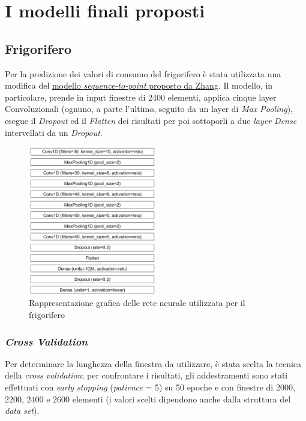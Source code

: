 \documentclass[12pt,a4paper,fleqn]{article}
\begin{document}
\section{I modelli finali proposti}

\subsection{Frigorifero}
Per la predizione dei valori di consumo del frigorifero è stata utilizzata una modifica del \href{https://arxiv.org/abs/1612.09106}{modello \textsl{sequence-to-point} proposto da Zhang}.
Il modello, in particolare, prende in input finestre di 2400 elementi, applica cinque layer Convoluzionali (ognuno, a parte l'ultimo, seguito da un layer di \textsl{Max Pooling}), esegue il \textsl{Dropout} ed il \textsl{Flatten} dei risultati per poi sottoporli a due \textsl{layer Dense} intervellati da un \textsl{Dropout}.

\begin{figure}
\centering
\includegraphics[width=0.5\textwidth]{images/fridge.png}
\caption{Rappresentazione grafica delle rete neurale utilizzata per il frigorifero}
\label{fig:frigorifero}
\end{figure}

\subsubsection{\textsl{Cross Validation}}
Per determinare la lunghezza della finestra da utilizzare, è stata scelta la tecnica della \textsl{cross validation}; per confrontare i risultati, gli addestramenti sono stati effettuati con \textsl{early stopping} (\textsl{patience} = 5) su 50 epoche e con finestre di 2000, 2200, 2400 e 2600 elementi (i valori scelti dipendono anche dalla struttura del \textsl{data set}).
\end{document}

